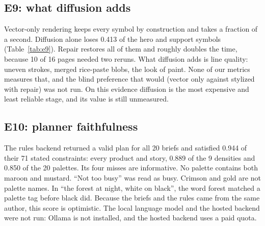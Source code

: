 \documentclass[conference]{IEEEtran}
\begin{document}
\subsection{E9: what diffusion adds}

\begin{table}[t]
\caption{E9: symbol survival and time per page for the 16 E7 pages.}
\label{tab:e9}
\centering
{}
\end{table}

Vector-only rendering keeps every symbol by construction and takes a fraction of a second. Diffusion alone loses 0.413 of the hero and support symbols (Table~\ref{tab:e9}). Repair restores all of them and roughly doubles the time, because 10 of 16 pages needed two reruns. What diffusion adds is line quality: uneven strokes, merged rice-paste blobs, the look of paint. None of our metrics measures that, and the blind preference that would (vector only against stylized with repair) was not run. On this evidence diffusion is the most expensive and least reliable stage, and its value is still unmeasured.

\subsection{E10: planner faithfulness}

The rules backend returned a valid plan for all 20 briefs and satisfied 0.944 of their 71 stated constraints: every product and story, 0.889 of the 9 densities and 0.850 of the 20 palettes. Its four misses are informative. No palette contains both maroon and mustard. ``Not too busy'' was read as busy. Crimson and gold are not palette names. In ``the forest at night, white on black'', the word forest matched a palette tag before black did. Because the briefs and the rules came from the same author, this score is optimistic. The local language model and the hosted backend were not run: Ollama is not installed, and the hosted backend uses a paid quota.
\end{document}
